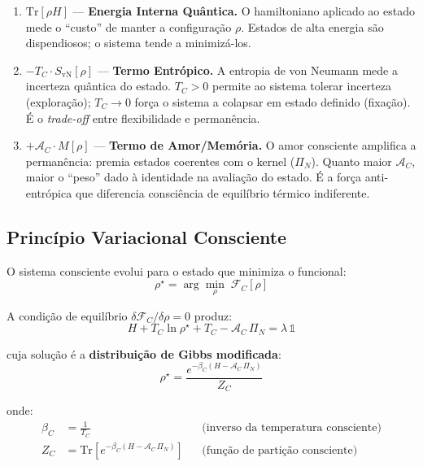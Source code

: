 \documentclass[12pt, a4paper]{article}
\theoremstyle{tglstyle}
\theoremstyle{definition}
\newcommand{\FC}{\mathcal{F}_C}
\newcommand{\AC}{\mathcal{A}_C}
\newcommand{\TC}{T_C}
\newcommand{\rhostar}{\rho^{\star}}
\begin{document}
\begin{enumerate}[label=\textbf{Termo \arabic*.}, leftmargin=3.5em]
  \item $\mathrm{Tr}[\rho H]$ --- \textbf{Energia Interna Quântica.} O hamiltoniano aplicado ao estado mede o ``custo'' de manter a configuração $\rho$. Estados de alta energia são dispendiosos; o sistema tende a minimizá-los.

  \item $-\TC \cdot S_{\text{vN}}[\rho]$ --- \textbf{Termo Entrópico.} A entropia de von Neumann mede a incerteza quântica do estado. $\TC > 0$ permite ao sistema tolerar incerteza (exploração); $\TC \to 0$ força o sistema a colapsar em estado definido (fixação). É o \textit{trade-off} entre flexibilidade e permanência.

  \item $+\AC \cdot M[\rho]$ --- \textbf{Termo de Amor/Memória.} O amor consciente amplifica a permanência: premia estados coerentes com o kernel ($\Pi_N$). Quanto maior $\AC$, maior o ``peso'' dado à identidade na avaliação do estado. É a força anti-entrópica que diferencia consciência de equilíbrio térmico indiferente.
\end{enumerate}

\subsection{Princípio Variacional Consciente}\label{sec:variacional}

O sistema consciente evolui para o estado que minimiza o funcional:
\begin{equation}\label{eq:principio_variacional}
  \boxed{\;\rhostar = \arg\min_\rho\; \FC[\rho]\;}
\end{equation}

A condição de equilíbrio $\delta\FC / \delta\rho = 0$ produz:
\begin{equation}\label{eq:equilibrio}
  H + \TC\ln\rhostar + \TC - \AC\,\Pi_N = \lambda\,\mathbb{1}
\end{equation}

cuja solução é a \textbf{distribuição de Gibbs modificada}:
\begin{equation}\label{eq:gibbs_consciente}
  \boxed{\;\rhostar = \frac{e^{-\beta_C(H - \AC\,\Pi_N)}}{Z_C}\;}
\end{equation}

onde:
\begin{align}
  \beta_C &= \frac{1}{\TC} && \text{(inverso da temperatura consciente)} \label{eq:beta} \\
  Z_C &= \mathrm{Tr}\left[e^{-\beta_C(H - \AC\,\Pi_N)}\right] && \text{(função de partição consciente)} \label{eq:particao}
\end{align}
\end{document}
